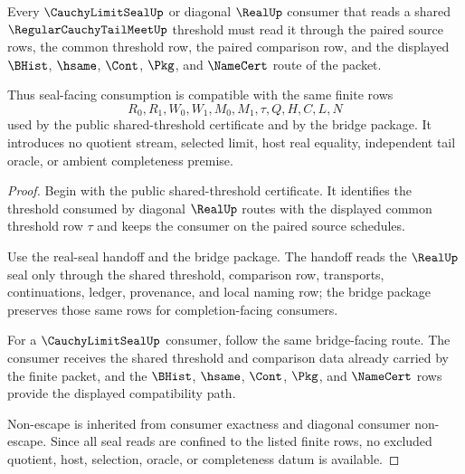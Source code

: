 \begin{theorem}
\label{thm:regular-cauchy-tail-meet-seal-compatibility}
Every $\CauchyLimitSealUp$ or diagonal $\RealUp$ consumer that reads a shared $\RegularCauchyTailMeetUp$ threshold must read it through the paired source rows, the common threshold row, the paired comparison row, and the displayed $\BHist$, $\hsame$, $\Cont$, $\Pkg$, and $\NameCert$ route of the packet.

Thus seal-facing consumption is compatible with the same finite rows
$$
R_0,R_1,W_0,W_1,M_0,M_1,\tau,Q,H,C,L,N
$$
used by the public shared-threshold certificate and by the bridge package. It introduces no quotient stream, selected limit, host real equality, independent tail oracle, or ambient completeness premise.
\end{theorem}
\begin{proof}
Begin with the public shared-threshold certificate. It identifies the threshold consumed by diagonal $\RealUp$ routes with the displayed common threshold row $\tau$ and keeps the consumer on the paired source schedules.

Use the real-seal handoff and the bridge package. The handoff reads the $\RealUp$ seal only through the shared threshold, comparison row, transports, continuations, ledger, provenance, and local naming row; the bridge package preserves those same rows for completion-facing consumers.

For a $\CauchyLimitSealUp$ consumer, follow the same bridge-facing route. The consumer receives the shared threshold and comparison data already carried by the finite packet, and the $\BHist$, $\hsame$, $\Cont$, $\Pkg$, and $\NameCert$ rows provide the displayed compatibility path.

Non-escape is inherited from consumer exactness and diagonal consumer non-escape. Since all seal reads are confined to the listed finite rows, no excluded quotient, host, selection, oracle, or completeness datum is available.
\end{proof}









